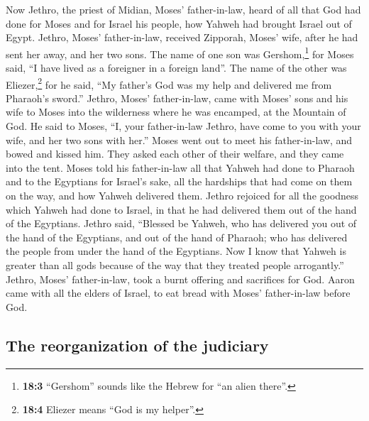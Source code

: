 \begin{paracol}{2}
\begin{otherlanguage}{english}
 Now Jethro, the priest of Midian, Moses' father-in-law,
heard of all that God had done for Moses and for Israel his people, how
Yahweh had brought Israel out of Egypt.  Jethro, Moses'
father-in-law, received Zipporah, Moses' wife, after he had sent her
away,  and her two sons. The name of one son was
Gershom,\footnote{\textbf{18:3} ``Gershom'' sounds like the Hebrew for
  ``an alien there''.} for Moses said, ``I have lived as a foreigner in
a foreign land''.  The name of the other was
Eliezer,\footnote{\textbf{18:4} Eliezer means ``God is my helper''.} for
he said, ``My father's God was my help and delivered me from Pharaoh's
sword.''  Jethro, Moses' father-in-law, came with Moses'
sons and his wife to Moses into the wilderness where he was encamped, at
the Mountain of God.  He said to Moses, ``I, your
father-in-law Jethro, have come to you with your wife, and her two sons
with her.''  Moses went out to meet his father-in-law, and
bowed and kissed him. They asked each other of their welfare, and they
came into the tent.  Moses told his father-in-law all that
Yahweh had done to Pharaoh and to the Egyptians for Israel's sake, all
the hardships that had come on them on the way, and how Yahweh delivered
them.  Jethro rejoiced for all the goodness which Yahweh
had done to Israel, in that he had delivered them out of the hand of the
Egyptians.  Jethro said, ``Blessed be Yahweh, who has
delivered you out of the hand of the Egyptians, and out of the hand of
Pharaoh; who has delivered the people from under the hand of the
Egyptians.  Now I know that Yahweh is greater than all
gods because of the way that they treated people arrogantly.''
 Jethro, Moses' father-in-law, took a burnt offering and
sacrifices for God. Aaron came with all the elders of Israel, to eat
bread with Moses' father-in-law before God.

\hypertarget{the-reorganization-of-the-judiciary}{%
\subsection{The reorganization of the
judiciary}\label{the-reorganization-of-the-judiciary}}


\end{otherlanguage}
\end{paracol}
